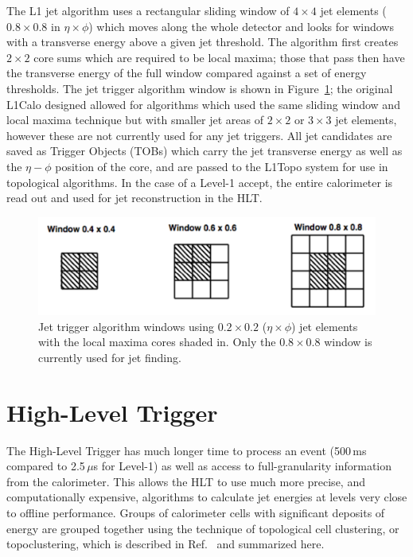 The L1 jet algorithm uses a rectangular sliding window of $4\times4$ jet elements ($0.8\times0.8$ in $\eta\times\phi$) which moves along the whole detector and looks for windows with a transverse energy above a given jet threshold.  The algorithm first creates $2\times2$ core sums which are required to be local maxima; those that pass then have the transverse energy of the full window compared against a set of energy thresholds.  The jet trigger algorithm window is shown in Figure~\ref{fig:JetWindows}; the original L1Calo designed allowed for algorithms which used the same sliding window and local maxima technique but with smaller jet areas of $2\times2$ or $3\times3$ jet elements, however these are not currently used for any jet triggers.  All jet candidates are saved as Trigger Objects (TOBs) which carry the jet transverse energy as well as the $\eta-\phi$ position of the core, and are passed to the L1Topo system for use in topological algorithms.  In the case of a Level-1 accept, the entire calorimeter is read out and used for jet reconstruction in the HLT.

\begin{figure}[h!]
	\centering
	\includegraphics[width=0.7\columnwidth]{figures/Detector/JetWindows.png}
	\caption{Jet trigger algorithm windows using $0.2\times0.2$ ($\eta\times\phi$) jet elements with the local maxima cores shaded in.  Only the $0.8\times0.8$ window is currently used for jet finding.\cite{L1Calo_Run1}
	}
	\label{fig:JetWindows}
\end{figure} 



\section{High-Level Trigger}
\label{sec:Topoclustering}
The High-Level Trigger has much longer time to process an event (500\,ms compared to 2.5\,$\mu$s for Level-1) as well as access to full-granularity information from the calorimeter.  This allows the HLT to use much more precise, and computationally expensive, algorithms to calculate jet energies at levels very close to offline performance.  Groups of calorimeter cells with significant deposits of energy are grouped together using the technique of topological cell clustering, or topoclustering, which is described in Ref.~\cite{Topoclustering} and summarized here.

